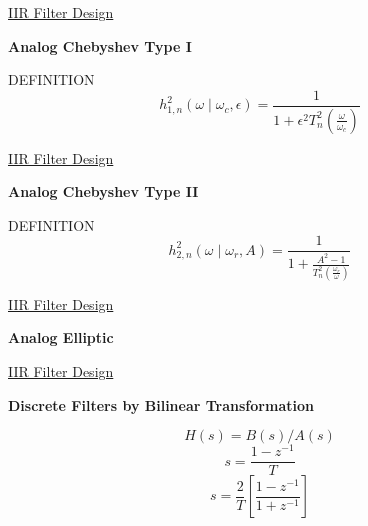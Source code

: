 \begin{slide}
{}
{\tiny\underline{IIR Filter Design}}
\begin{center}
{\bf Analog Chebyshev Type I}
\end{center}
\vfill
\vbox{
{\tiny
DEFINITION
%
$$
 h_{1,n}^2(\omega \mid \omega_c , \epsilon)=\frac{1}{1+\epsilon^2 T_{n}^2(
\frac{\omega}{\omega_c})}
$$
%
}}
\vfill
\vbox{
}
\vfill
\end{slide}
\begin{slide}
{}
{\tiny\underline{IIR Filter Design}}
\begin{center}
{\bf Analog Chebyshev Type II}
\end{center}
\vfill
\vbox{
{\tiny
DEFINITION
%
$$
 h_{2,n}^{2}(\omega \mid \omega_r , A ) = \frac{1}{1+\frac{A^2-1}{T_{n}^{2}(\frac{\omega_r}{\omega})}}
$$
%
}}
\vfill
\vbox{
}
\vfill
\end{slide}
\begin{slide}
{}
{\tiny\underline{IIR Filter Design}}
\begin{center}
{\bf Analog Elliptic}
\end{center}
\vfill
\vbox{
}
\vfill
\end{slide}
\begin{slide}
{}
{\tiny\underline{IIR Filter Design}}
\begin{center}
{\bf Discrete Filters by Bilinear Transformation}
\end{center}
\vfill
\vbox{
{\tiny
%
$$
H(s)=B(s)/A(s)
$$
%
\vfil
%
$$
s=\frac{1-z^{-1}}{T}
$$
%
}}
\vfill
\vbox{
}
\vfill
\vbox{
{\tiny
%
$$
s=\frac{2}{T}[\frac{1-z^{-1}}{1+z^{-1}}]
$$
%
}}
\vfill
\end{slide}
